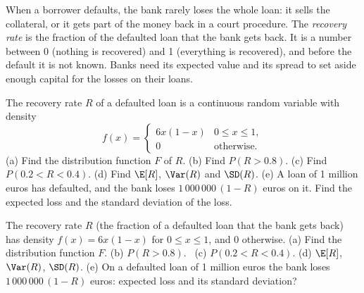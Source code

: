 
\begin{problem}
	\begin{context}
		When a borrower defaults, the bank rarely loses the whole loan: it sells
		the collateral, or it gets part of the money back in a court procedure.
		The \emph{recovery rate} is the fraction of the defaulted loan that the
		bank gets back. It is a number between 0 (nothing is recovered) and 1
		(everything is recovered), and before the default it is not known.
		Banks need its expected value and its spread to set aside enough
		capital for the losses on their loans.
	\end{context}
	The recovery rate $R$ of a defaulted loan is a continuous random variable
	with density
	\[
		f(x)=\begin{cases}
			6x(1-x) & 0\le x\le 1, \\
			0       & \text{otherwise}.
		\end{cases}
	\]
	(a) Find the distribution function $F$ of $R$.
	(b) Find $P(R>0.8)$.
	(c) Find $P(0.2<R<0.4)$.
	(d) Find $\E[R]$, $\Var(R)$ and $\SD(R)$.
	(e) A loan of 1 million euros has defaulted, and the bank loses
	$1\,000\,000\,(1-R)$ euros on it. Find the expected loss and the standard
	deviation of the loss.
\end{problem}

\begin{slideproblem}
	The recovery rate $R$ (the fraction of a defaulted loan that the bank
	gets back) has density $f(x)=6x(1-x)$ for $0\le x\le1$, and $0$ otherwise.
	(a) Find the distribution function $F$.
	(b) $P(R>0.8)$. \ (c) $P(0.2<R<0.4)$.
	(d) $\E[R]$, $\Var(R)$, $\SD(R)$.
	(e) On a defaulted loan of 1 million euros the bank loses
	$1\,000\,000\,(1-R)$ euros: expected loss and its standard deviation?
\end{slideproblem}

